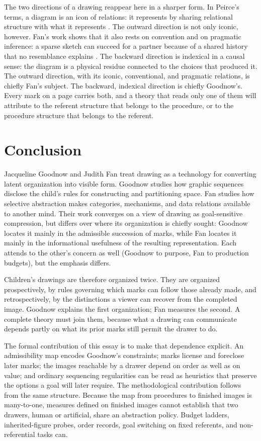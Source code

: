 \documentclass[11pt]{article}
\theoremstyle{remark}
\begin{document}
The two directions of a drawing reappear here in a sharper form. In Peirce's terms, a diagram is an icon of relations: it represents by sharing relational structure with what it represents \cite{peirce}. The outward direction is not only iconic, however. Fan's work shows that it also rests on convention and on pragmatic inference: a sparse sketch can succeed for a partner because of a shared history that no resemblance explains \cite{hawkins2023resemblance,fan2020pragmatic}. The backward direction is indexical in a causal sense: the diagram is a physical residue connected to the choices that produced it. The outward direction, with its iconic, conventional, and pragmatic relations, is chiefly Fan's subject. The backward, indexical direction is chiefly Goodnow's. Every mark on a page carries both, and a theory that reads only one of them will attribute to the referent structure that belongs to the procedure, or to the procedure structure that belongs to the referent.

\section{Conclusion}

Jacqueline Goodnow and Judith Fan treat drawing as a technology for converting latent organization into visible form. Goodnow studies how graphic sequences disclose the child's rules for constructing and partitioning space. Fan studies how selective abstraction makes categories, mechanisms, and data relations available to another mind. Their work converges on a view of drawing as goal-sensitive compression, but differs over where its organization is chiefly sought: Goodnow locates it mainly in the admissible succession of marks, while Fan locates it mainly in the informational usefulness of the resulting representation. Each attends to the other's concern as well (Goodnow to purpose, Fan to production budgets), but the emphasis differs.

Children's drawings are therefore organized twice. They are organized prospectively, by rules governing which marks can follow those already made, and retrospectively, by the distinctions a viewer can recover from the completed image. Goodnow explains the first organization; Fan measures the second. A complete theory must join them, because what a drawing can communicate depends partly on what its prior marks still permit the drawer to do.

The formal contribution of this essay is to make that dependence explicit. An admissibility map encodes Goodnow's constraints; marks license and foreclose later marks; the images reachable by a drawer depend on order as well as on value; and ordinary sequencing regularities can be read as heuristics that preserve the options a goal will later require. The methodological contribution follows from the same structure. Because the map from procedures to finished images is many-to-one, measures defined on finished images cannot establish that two drawers, human or artificial, share an abstraction policy. Budget ladders, inherited-figure probes, order records, goal switching on fixed referents, and non-referential tasks can.
\end{document}
